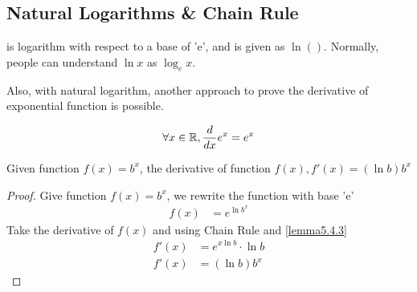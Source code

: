 \subsection{Natural Logarithms \& Chain Rule}
\begin{definition}
    is logarithm with respect to a base of 'e', and is given as $\ln ()$.
    Normally, people can understand $\ln x$ as $\log_e{x}$.
\end{definition}

Also, with natural logarithm, another approach to prove the derivative of exponential function is possible.
\begin{lemma} \label{lemma5.4.3}
    \[
        \forall x \in \mathbb{R}, \frac{d}{dx} e^x = e^x
    \]
\end{lemma} 

\begin{proposition}
    Given function $f(x) = b^x$, the derivative of function $f(x), f'(x) = (\ln b) b^x$
    \begin{proof}
        Give function $f(x) = b^x$, we rewrite the function with base 'e'
        \begin{align}
            f(x) &= e^{
                \ln b^x
            } 
        \end{align}
        Take the derivative of $f(x)$ and using Chain Rule and \ref{lemma5.4.3} 
        \begin{align}
            f'(x) &= e^{x\ln b} \cdot \ln b \\
            f'(x) &= \left(\ln b\right) b^x
        \end{align}
    \end{proof}
\end{proposition}
